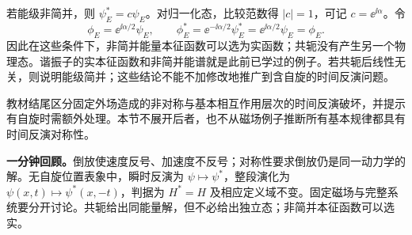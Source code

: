 若能级非简并，则 $\psi_E^*=c\psi_E$。对归一化态，比较范数得 $|c|=1$，可记 $c=\ee^{\ii\alpha}$。令
\begin{equation}
  \phi_E=\ee^{\ii\alpha/2}\psi_E,
  \qquad
  \phi_E^*=\ee^{-\ii\alpha/2}\psi_E^*
           =\ee^{\ii\alpha/2}\psi_E=\phi_E.
\end{equation}
因此在这些条件下，非简并能量本征函数可以选为实函数；共轭没有产生另一个物理态。谐振子的实本征函数和非简并能谱就是此前已学过的例子。若共轭后线性无关，则说明能级简并；这些结论不能不加修改地推广到含自旋的时间反演问题。

教材结尾区分固定外场造成的非对称与基本相互作用层次的时间反演破坏，并提示有自旋时需额外处理。本节不展开后者，也不从磁场例子推断所有基本规律都具有时间反演对称性。

\textbf{一分钟回顾。}倒放使速度反号、加速度不反号；对称性要求倒放仍是同一动力学的解。无自旋位置表象中，瞬时反演为 $\psi\mapsto\psi^*$，整段演化为 $\psi(x,t)\mapsto\psi^*(x,-t)$，判据为 $H^*=H$ 及相应定义域不变。固定磁场与完整系统要分开讨论。共轭给出同能量解，但不必给出独立态；非简并本征函数可以选实。
